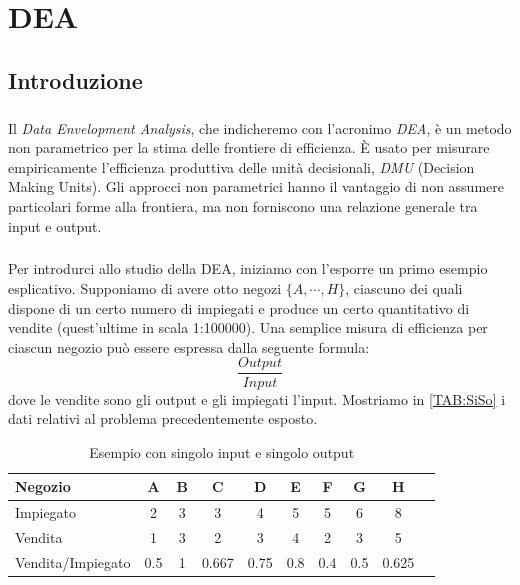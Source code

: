 \chapter{DEA} \label{CAP:uno}
\section{Introduzione}
\bigskip

\paragraph{} Il \emph{Data Envelopment Analysis}, che indicheremo con l'acronimo \emph{DEA}, \`e un metodo non parametrico per la stima delle frontiere di efficienza. \`E usato per misurare empiricamente l'efficienza produttiva delle unit\`a decisionali, \emph{DMU} (Decision Making Units). Gli approcci non parametrici hanno il vantaggio di non assumere particolari forme alla frontiera, ma non forniscono una relazione generale tra input e output.
\paragraph{} Per introdurci allo studio della DEA, iniziamo con l'esporre un primo esempio esplicativo. Supponiamo di avere otto negozi $\{A,\cdots,H\}$, ciascuno dei quali dispone di un certo numero di impiegati e produce un certo quantitativo di vendite (quest'ultime in scala 1:100000). Una semplice misura di efficienza per ciascun negozio può essere espressa dalla seguente formula:
\begin{equation}
\dfrac{Output}{Input}
\end{equation}
dove le vendite sono gli output e gli impiegati l'input. Mostriamo in \autoref{TAB:SiSo} i dati relativi al problema precedentemente esposto.

\begin{table}[H]
\centering
\begin{tabular}{lccccccccc}
\hline 
Negozio & A & B & C & D & E & F & G & H \\ 
\hline 
Impiegato & 2 & 3 & 3 & 4 & 5 & 5 & 6 & 8 \\ 
\hline 
Vendita & 1 & 3 & 2 & 3 & 4 & 2 & 3 & 5 \\ 
\hline 
Vendita/Impiegato & 0.5 & 1 & 0.667 & 0.75 & 0.8 & 0.4 & 0.5 & 0.625 \\ 
\hline 
\end{tabular}
\caption{Esempio con singolo input e singolo output} \label{TAB:SiSo}
\end{table}

